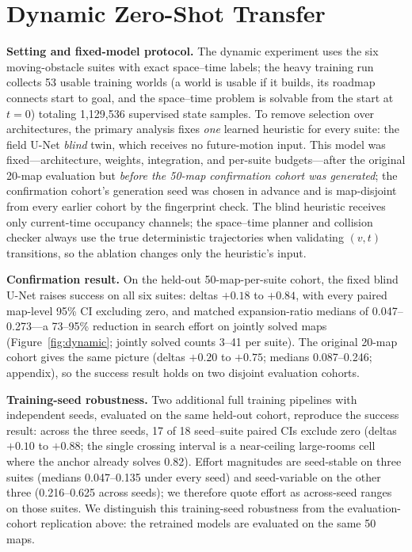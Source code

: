 \documentclass[letterpaper]{article} %
\begin{document}
\section{Dynamic Zero-Shot Transfer}

\textbf{Setting and fixed-model protocol.} The dynamic experiment uses the six moving-obstacle suites with exact space--time labels; the heavy training run collects 53 usable training worlds (a world is usable if it builds, its roadmap connects start to goal, and the space--time problem is solvable from the start at $t{=}0$) totaling 1{,}129{,}536 supervised state samples. To remove selection over architectures, the primary analysis fixes \emph{one} learned heuristic for every suite: the field U-Net \emph{blind} twin, which receives no future-motion input. This model was fixed---architecture, weights, integration, and per-suite budgets---after the original 20-map evaluation but \emph{before the 50-map confirmation cohort was generated}; the confirmation cohort's generation seed was chosen in advance and is map-disjoint from every earlier cohort by the fingerprint check. The blind heuristic receives only current-time occupancy channels; the space--time planner and collision checker always use the true deterministic trajectories when validating $(v,t)$ transitions, so the ablation changes only the heuristic's input.

\textbf{Confirmation result.} On the held-out 50-map-per-suite cohort, the fixed blind U-Net raises success on all six suites: deltas $+0.18$ to $+0.84$, with every paired map-level 95\% CI excluding zero, and matched expansion-ratio medians of 0.047--0.273---a 73--95\% reduction in search effort on jointly solved maps (Figure~\ref{fig:dynamic}; jointly solved counts 3--41 per suite). The original 20-map cohort gives the same picture (deltas $+0.20$ to $+0.75$; medians 0.087--0.246; appendix), so the success result holds on two disjoint evaluation cohorts.

\textbf{Training-seed robustness.} Two additional full training pipelines with independent seeds, evaluated on the same held-out cohort, reproduce the success result: across the three seeds, 17 of 18 seed--suite paired CIs exclude zero (deltas $+0.10$ to $+0.88$; the single crossing interval is a near-ceiling large-rooms cell where the anchor already solves 0.82). Effort magnitudes are seed-stable on three suites (medians 0.047--0.135 under every seed) and seed-variable on the other three (0.216--0.625 across seeds); we therefore quote effort as across-seed ranges on those suites. We distinguish this training-seed robustness from the evaluation-cohort replication above: the retrained models are evaluated on the same 50 maps.
\end{document}
